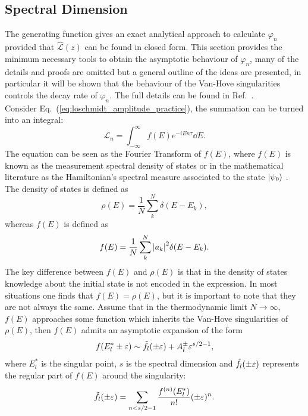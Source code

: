 \documentclass[12pt]{article}
\numberwithin{equation}{section}
\newcommand{\1}{\mathbb{1}}
\newcommand{\Lz}{\hat{\mathcal{L}}(z)}
\newcommand{\vanhove}{E^*_l}
\begin{document}
\subsection{Spectral Dimension}\label{sec:spectral_dimension}
The generating function gives an exact analytical approach to calculate $\varphi_n$ provided that $\Lz$ can be found in closed form. This section provides the minimum necessary tools to obtain the asymptotic behaviour of $\varphi_n$, many of the details and proofs are omitted but a general outline of the ideas are presented, in particular it will be shown that the behaviour of the Van-Hove singularities controls the decay rate of $\varphi_n$. The full details can be found in Ref.~\cite{Thiel_2018}.
\\
Consider Eq.~(\ref{eq:loschmidt_amplitude_practice}), the summation can be turned into an integral:
\begin{equation}
    \mathcal{L}_n=\int_{-\infty}^{\infty} f(E)e^{-iEn\tau} \dd E. \label{eq:amplitude_fourier_transform}
\end{equation}
The equation can be seen as the Fourier Transform of $f(E)$,
where $f(E)$ is known as the measurement spectral density of states or in the mathematical literature as the Hamiltonian's spectral measure associated to the state $\ket{\psi_0}$ \cite{marchetti2012asymptotic}. 
The density of states is defined as 
\begin{equation}
    \rho(E)=\frac{1}{N}\sum^{N}_k \delta(E-E_k),
\end{equation}
whereas $f(E)$ is defined as 
\begin{equation}
    f(E)=\frac{1}{N}\sum_k^{N} \abs{a_k}^2 \delta(E-E_k). 
\end{equation}
The key difference between $f(E)$ and $\rho(E)$ is that in the density of states knowledge about the initial state is not encoded in the expression. In most situations one finds that $f(E)=\rho(E)$, but it is important to note that they are not always the same. Assume that in the thermodynamic limit $N\to\infty$, $f(E)$ approaches some function which inherits the Van-Hove singularities of $\rho(E)$, then $f(E)$ admits an asymptotic expansion of the form 
\begin{equation}
    f(\vanhove\pm \varepsilon)\sim \Tilde{f}_l(\pm\varepsilon)+ A_l^{\pm} \varepsilon^{s/2-1},
\end{equation}
where $\vanhove$ is the singular point, $s$ is the spectral dimension and $\Tilde{f}_l(\pm\varepsilon)$ represents the regular part of $f(E)$ around the singularity:
\begin{equation}
    \Tilde{f}_l(\pm\varepsilon)=\sum_{n<s/2-1} \frac{f^{(n)}(\vanhove)}{n!}(\pm\varepsilon)^{n}.
\end{equation}
\end{document}
